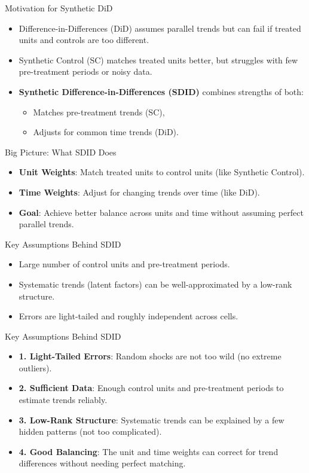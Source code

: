\documentclass{beamer}
\begin{document}
\begin{frame}{Motivation for Synthetic DiD}
\small
\begin{itemize}
  \item Difference-in-Differences (DiD) assumes parallel trends but can fail if treated units and controls are too different.
  \item Synthetic Control (SC) matches treated units better, but struggles with few pre-treatment periods or noisy data.
  \item \textbf{Synthetic Difference-in-Differences (SDID)} combines strengths of both:
  \begin{itemize}
    \item Matches pre-treatment trends (SC),
    \item Adjusts for common time trends (DiD).
  \end{itemize}
\end{itemize}
\end{frame}




\begin{frame}{Big Picture: What SDID Does}
\small
\begin{itemize}
  \item \textbf{Unit Weights}: Match treated units to control units (like Synthetic Control).
  \item \textbf{Time Weights}: Adjust for changing trends over time (like DiD).
  \item \textbf{Goal}: Achieve better balance across units and time without assuming perfect parallel trends.
\end{itemize}
\end{frame}




\begin{frame}{Key Assumptions Behind SDID}
\small
\begin{itemize}
  \item Large number of control units and pre-treatment periods.
  \item Systematic trends (latent factors) can be well-approximated by a low-rank structure.
  \item Errors are light-tailed and roughly independent across cells.
\end{itemize}
\end{frame}


\begin{frame}{Key Assumptions Behind SDID}
\small
\begin{itemize}
  \item \textbf{1. Light-Tailed Errors}: Random shocks are not too wild (no extreme outliers).
  \item \textbf{2. Sufficient Data}: Enough control units and pre-treatment periods to estimate trends reliably.
  \item \textbf{3. Low-Rank Structure}: Systematic trends can be explained by a few hidden patterns (not too complicated).
  \item \textbf{4. Good Balancing}: The unit and time weights can correct for trend differences without needing perfect matching.
\end{itemize}
\end{frame}
\end{document}
